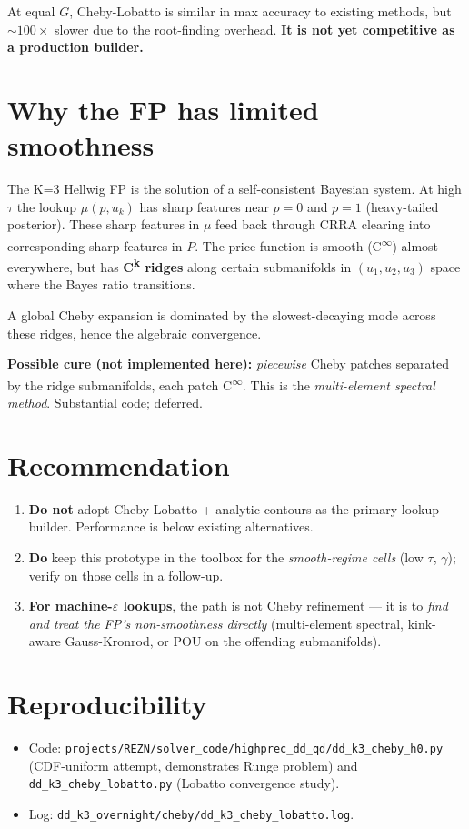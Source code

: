 \documentclass[11pt]{article}
\begin{document}
At equal $G$, Cheby-Lobatto is similar in max accuracy to existing
methods, but $\sim 100\times$ slower due to the root-finding overhead.
\textbf{It is not yet competitive as a production builder.}

\section{Why the FP has limited smoothness}

The K=3 Hellwig FP is the solution of a self-consistent Bayesian system.
At high $\tau$ the lookup $\mu(p, u_k)$ has sharp features near $p = 0$ and
$p = 1$ (heavy-tailed posterior). These sharp features in $\mu$ feed back
through CRRA clearing into corresponding sharp features in $P$. The price
function is smooth (C\textsuperscript{$\infty$}) almost everywhere, but
has \textbf{C\textsuperscript{k} ridges} along certain submanifolds in
$(u_1, u_2, u_3)$ space where the Bayes ratio transitions.

A global Cheby expansion is dominated by the slowest-decaying mode
across these ridges, hence the algebraic convergence.

\textbf{Possible cure (not implemented here):} \emph{piecewise} Cheby
patches separated by the ridge submanifolds, each patch C\textsuperscript{$\infty$}.
This is the \emph{multi-element spectral method}. Substantial code;
deferred.

\section{Recommendation}

\begin{enumerate}
  \item \textbf{Do not} adopt Cheby-Lobatto + analytic contours as the
        primary lookup builder. Performance is below existing alternatives.
  \item \textbf{Do} keep this prototype in the toolbox for the
        \emph{smooth-regime cells} (low $\tau$, $\gamma$); verify
        on those cells in a follow-up.
  \item \textbf{For machine-$\varepsilon$ lookups}, the path is not Cheby
        refinement --- it is to \emph{find and treat the FP's
        non-smoothness directly} (multi-element spectral, kink-aware
        Gauss-Kronrod, or POU on the offending submanifolds).
\end{enumerate}

\section{Reproducibility}

\begin{itemize}
  \item Code:
        \texttt{projects/REZN/solver\_code/highprec\_dd\_qd/dd\_k3\_cheby\_h0.py}
        (CDF-uniform attempt, demonstrates Runge problem) and
        \texttt{dd\_k3\_cheby\_lobatto.py} (Lobatto convergence study).
  \item Log: \texttt{dd\_k3\_overnight/cheby/dd\_k3\_cheby\_lobatto.log}.
\end{itemize}
\end{document}
